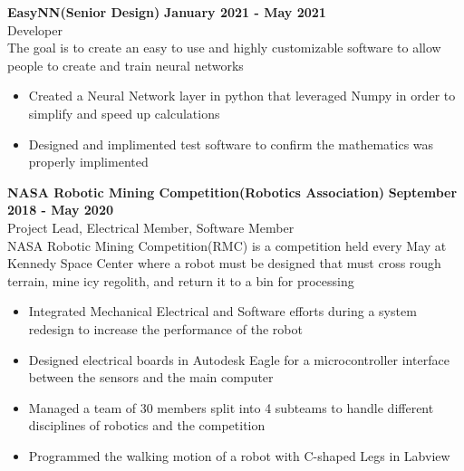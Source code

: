 \documentclass[10pt]{article}
\newcommand{\entrySpacing}{4pt}
\begin{document}
\noindent\begin{minipage}{\linewidth}
\textbf{EasyNN(Senior Design)} \hfill \textbf{January 2021 - May 2021}\\
Developer\hfill \\The goal is to create an easy to use and highly customizable software to allow people to create and train neural networks
\begin{itemize}[noitemsep,nolistsep]
\item Created a Neural Network layer in python that leveraged Numpy in order to simplify and speed up calculations
\item Designed and implimented test software to confirm the mathematics was properly implimented
\end{itemize}


\end{minipage}
\vspace{\entrySpacing}

\noindent\begin{minipage}{\linewidth}
\textbf{NASA Robotic Mining Competition(Robotics Association)} \hfill \textbf{September 2018 - May 2020}\\
Project Lead, Electrical Member, Software Member\hfill \\NASA Robotic Mining Competition(RMC) is a competition held every May at Kennedy Space Center where a robot must be designed that must cross rough terrain, mine icy regolith, and return it to a bin for processing
\begin{itemize}[noitemsep,nolistsep]
\item Integrated Mechanical Electrical and Software efforts during a system redesign  to increase the performance of the robot
\item Designed electrical boards in Autodesk Eagle for a microcontroller interface between the sensors and the main computer
\item Managed a team of 30 members split into 4 subteams to handle different disciplines of robotics and the competition
\item Programmed the walking motion of a robot with C-shaped Legs in Labview
\end{itemize}


\end{minipage}
\vspace{\entrySpacing}
\end{document}
